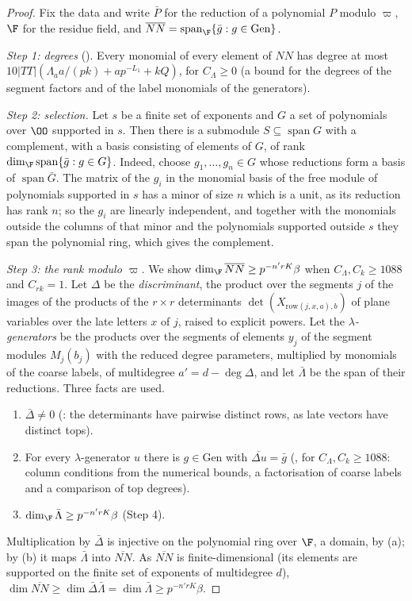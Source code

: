 \begin{proof}
Fix the data and write $\bar P$ for the reduction of a polynomial $P$ modulo $\varpi$, $\F$ for the residue field, and
$\overline{NN}=\operatorname{span}_\F\{\bar g:g\in\mathrm{Gen}\}$.

\emph{Step 1: degrees} (). Every monomial of every element of $NN$
has degree at most $10|TT|(\Lambda_aa/(pk)+ap^{-L_1}+kQ)$, for $C_\Lambda\ge0$ (a bound for the degrees of the segment factors
and of the label monomials of the generators).

\emph{Step 2: selection.} Let $s$ be a finite set of exponents and $G$ a set of polynomials over $\OO$ supported in $s$. Then
there is a submodule $S\subseteq\operatorname{span}G$ with a complement, with a basis consisting of elements of $G$, of rank
$\dim_\F\operatorname{span}\{\bar g:g\in G\}$. Indeed, choose
$g_1,\dots,g_n\in G$ whose reductions form a basis of $\operatorname{span}\bar G$. The matrix of the $g_i$ in the monomial basis
of the free module of polynomials supported in $s$ has a minor of size $n$ which is a unit, as its reduction has rank $n$; so
the $g_i$ are linearly independent, and together with the monomials outside the columns of that minor and the
polynomials supported outside $s$ they span the polynomial ring, which gives the complement.

\emph{Step 3: the rank modulo $\varpi$.} We show $\dim_\F\overline{NN}\ge p^{-n'rK}\beta$ when $C_\Lambda,C_k\ge1088$ and $C_{rk}=1$.
Let $\Delta$ be the \emph{discriminant}, the product over the segments $j$ of the images of the products of the $r\times r$
determinants $\det(X_{\mathrm{row}(j,x,a),b})$ of plane variables over the late letters $x$ of $j$, raised to explicit powers.
Let the \emph{$\lambda$-generators} be the products over the segments of elements $y_j$ of the segment modules $M_j(b_j)$ with
the reduced degree parameters, multiplied by monomials of the coarse labels, of multidegree $a'=d-\deg\Delta$, and let
$\bar\Lambda$ be the span of their reductions. Three facts are used.
\begin{enumerate}[label=(\alph*)]
\item $\bar\Delta\ne0$ (: the
determinants have pairwise distinct rows, as late vectors have distinct tops).
\item For every $\lambda$-generator $u$ there is $g\in\mathrm{Gen}$ with $\overline{\Delta u}=\bar g$
(, for $C_\Lambda,C_k\ge1088$: column
conditions from the numerical bounds, a factorisation of coarse labels and a comparison of top degrees).
\item $\dim_\F\bar\Lambda\ge p^{-n'rK}\beta$ (Step 4).
\end{enumerate}
Multiplication by $\bar\Delta$ is injective on the polynomial ring over $\F$, a domain, by (a); by (b) it maps $\bar\Lambda$ into
$\overline{NN}$. As $\overline{NN}$ is finite-dimensional (its elements are supported on the finite set of exponents of
multidegree $d$), $\dim\overline{NN}\ge\dim\bar\Delta\bar\Lambda=\dim\bar\Lambda\ge p^{-n'rK}\beta$.


\end{proof}
